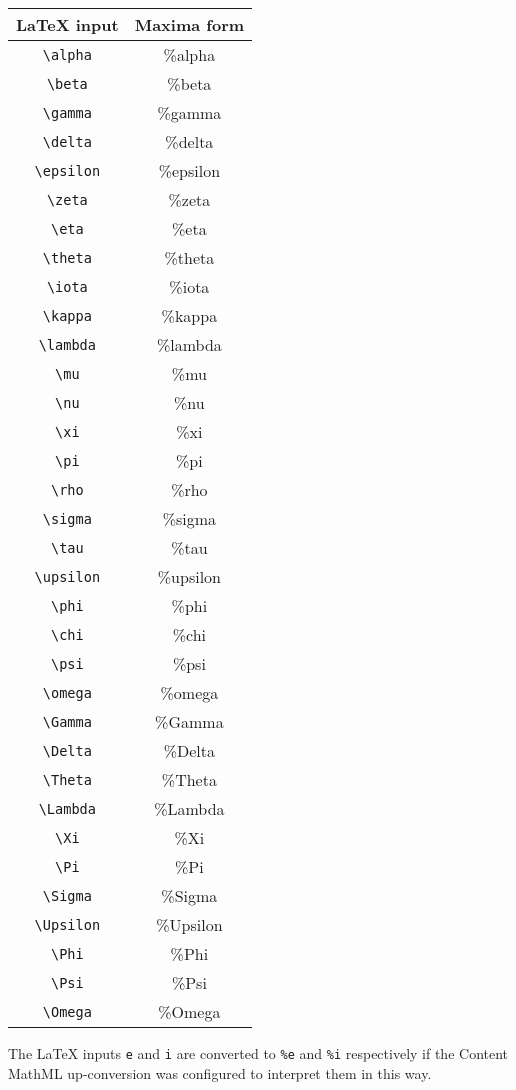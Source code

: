 \begin{tabular}{|c|c|}
\hline
LaTeX input & Maxima form \\
\hline
\verb|\alpha| & \%alpha \\
\verb|\beta| & \%beta \\
\verb|\gamma| & \%gamma \\
\verb|\delta| & \%delta \\
\verb|\epsilon| & \%epsilon \\
\verb|\zeta| & \%zeta \\
\verb|\eta| & \%eta \\
\verb|\theta| & \%theta \\
\verb|\iota| & \%iota \\
\verb|\kappa| & \%kappa \\
\verb|\lambda| & \%lambda \\
\verb|\mu| & \%mu \\
\verb|\nu| & \%nu \\
\verb|\xi| & \%xi \\
\verb|\pi| & \%pi \\
\verb|\rho| & \%rho \\
\verb|\sigma| & \%sigma \\
\verb|\tau| & \%tau \\
\verb|\upsilon| & \%upsilon \\
\verb|\phi| & \%phi \\
\verb|\chi| & \%chi \\
\verb|\psi| & \%psi \\
\verb|\omega| & \%omega \\
\verb|\Gamma| & \%Gamma \\
\verb|\Delta| & \%Delta \\
\verb|\Theta| & \%Theta \\
\verb|\Lambda| & \%Lambda \\
\verb|\Xi| & \%Xi \\
\verb|\Pi| & \%Pi \\
\verb|\Sigma| & \%Sigma \\
\verb|\Upsilon| & \%Upsilon \\
\verb|\Phi| & \%Phi \\
\verb|\Psi| & \%Psi \\
\verb|\Omega| & \%Omega \\
\hline
\hline
\end{tabular}

The LaTeX inputs \verb|e| and \verb|i| are converted to \verb|%e|
and \verb|%i| respectively if the Content MathML up-conversion
was configured to interpret them in this way.

